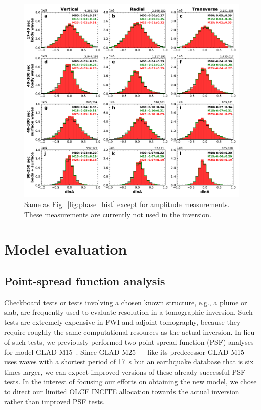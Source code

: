 \documentclass[extra,mreferee]{gji}
\begin{document}
\begin{figure}
  \centering
  \includegraphics[width=\textwidth]{figures/dlna_histogram.pdf}
  \caption{Same as Fig.~\ref{fig:phase_hist} except for amplitude measurements. These measurements are currently not used in the inversion.}
  \label{fig:amp_hist}
\end{figure}

\section{Model evaluation}
\label{section:evaluation}


\subsection{Point-spread function analysis}

Checkboard tests or tests involving a chosen known structure, e.g., a plume or slab,
are frequently used to evaluate resolution in a tomographic inversion.
Such tests are extremely expensive in FWI and adjoint tomography, because they
require roughly the same computational resources as the actual inversion.
In lieu of such tests, we previously performed two point-spread function (PSF) analyses
for model GLAD-M15~\citep{bozdaug2016global}.
Since GLAD-M25 --- like its predecessor GLAD-M15 --- uses waves with a shortest period of 17~s
but an earthquake database that is six times larger,
we can expect improved versions of these already successful PSF tests.
In the interest of focusing our efforts on obtaining the new model,
we chose to direct our limited OLCF INCITE allocation towards the actual inversion
rather than improved PSF tests.
\end{document}
